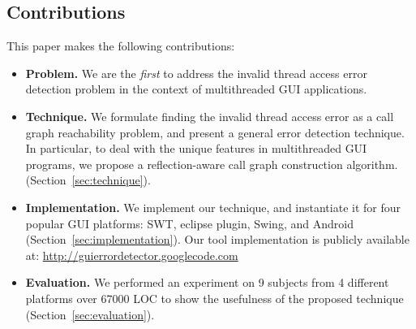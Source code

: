 \subsection{Contributions}

This paper makes the following contributions:

\begin{itemize}
\item \textbf{Problem.} We are the \textit{first} to address
the invalid thread access error detection problem in the context of multithreaded GUI applications.

\item \textbf{Technique.} We formulate finding
the invalid thread access error as a call graph reachability problem,
and present a general error detection technique.
In particular, to deal with the unique features in
multithreaded GUI programs, we propose a reflection-aware
call graph construction algorithm. (Section~\ref{sec:technique}).

\item \textbf{Implementation.} We implement our technique, and
instantiate it for four
popular GUI platforms: SWT, eclipse plugin, Swing, and Android (Section~\ref{sec:implementation}). Our
tool implementation is publicly available at:
\url{http://guierrordetector.googlecode.com}

\item \textbf{Evaluation.} We performed an experiment on 9 subjects
from 4 different platforms over 67000 LOC to show the usefulness
of the proposed technique (Section~\ref{sec:evaluation}).

\end{itemize}

